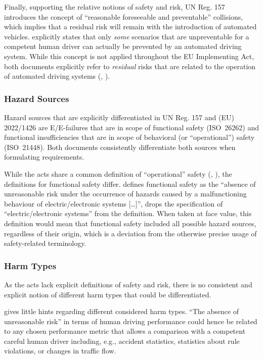 Finally, supporting the relative notions of safety and risk, UN Reg. 157 introduces the concept of ``reasonable foreseeable and preventable'' \parencite[Article 1, Clause 5.1.1.]{un157} collisions, which implies that a residual risk will remain with the introduction of automated vehicles.
\parencite[][Appendix 3, Clause 3.1.]{un157} explicitly states that only \emph{some} scenarios that are unpreventable for a competent human driver can actually be prevented by an automated driving system.
While this concept is not applied throughout the EU Implementing Act, both documents explicitly refer to \emph{residual} risks that are related to the operation of automated driving systems (\parencite[][Annex I, Clause 1]{un157}, \parencite[][Annex II, Clause 7.1.1.]{eu1426}).

\subsubsection{Hazard Sources}
Hazard sources that are explicitly differentiated in UN Reg. 157 and (EU) 2022/1426 are E/E-failures that are in scope of functional safety (ISO~26262) and functional insufficiencies that are in scope of behavioral (or ``operational'') safety (ISO~21448).
Both documents consistently differentiate both sources when formulating requirements.

While the acts share a common definition of ``operational'' safety (\parencite[][Article 2, def. 30.]{eu1426}, \parencite[][Annex 4, def. 2.15.]{un157}), the definitions for functional safety differ.
\parencite{un157} defines functional safety as the ``absence of unreasonable risk under the occurrence of hazards caused by a malfunctioning behaviour of electric/electronic systems [\ldots]'', \parencite{eu1426} drops the specification of ``electric/electronic systems'' from the definition.
When taken at face value, this definition would mean that functional safety included all possible hazard sources, regardless of their origin, which is a deviation from the otherwise precise usage of safety-related terminology.

\subsubsection{Harm Types}
As the acts lack explicit definitions of safety and risk, there is no consistent and explicit notion of different harm types that could be differentiated.

\parencite{un157} gives little hints regarding different considered harm types.
``The absence of unreasonable risk'' in terms of human driving performance could hence be related to any chosen performance metric that allows a comparison with a competent careful human driver including, e.g., accident statistics, statistics about rule violations, or changes in traffic flow.

